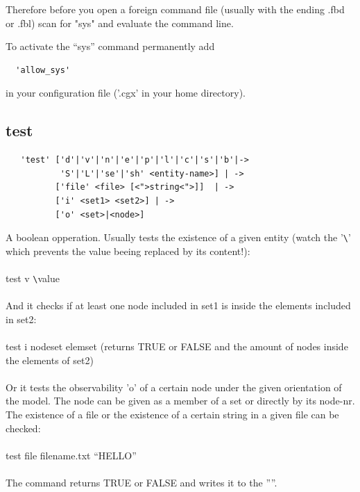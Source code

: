\documentclass{article}
\begin{document}
Therefore before you open a foreign command file (usually with the ending .fbd or .fbl) scan for "sys" and evaluate the command line.

To activate the ``sys'' command permanently add
\begin{verbatim}
  'allow_sys'
\end{verbatim}
in your configuration file ('.cgx' in your home directory).
 
\subsection{\label{test}test}
\begin{verbatim}
   'test' ['d'|'v'|'n'|'e'|'p'|'l'|'c'|'s'|'b'|->
           'S'|'L'|'se'|'sh' <entity-name>] | ->
          ['file' <file> [<">string<">]]  | ->
          ['i' <set1> <set2>] | ->
          ['o' <set>|<node>]
\end{verbatim}
A boolean opperation. Usually tests the existence of a given entity (watch the '\verb_\_' which prevents the value beeing replaced by its content!):\\\\test v \verb_\_value\\\\And it checks if at least one node included in set1 is inside the elements included in set2:\\\\test i nodeset elemset (returns TRUE or FALSE and the amount of nodes inside the elements of set2)\\\\Or it tests the observability 'o' of a certain node under the given orientation of the model. The node can be given as a member of a set or directly by its node-nr. The existence of a file or the existence of a certain string in a given file can be checked:\\\\test file filename.txt ``HELLO''\\\\The command returns TRUE or FALSE and writes it to the ''''.
\end{document}
